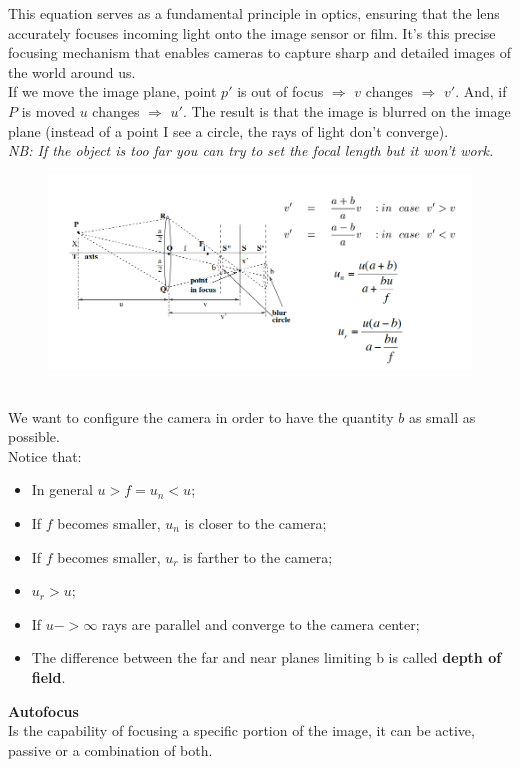 This equation serves as a fundamental principle in optics, ensuring that the lens accurately focuses incoming light onto the image sensor or film. 
It's this precise focusing mechanism that enables cameras to capture sharp and detailed images of the world around us.\\

If we move the image plane, point $p'$ is out of focus $\Rightarrow$ $v$ changes $\Rightarrow$ $v'$. And, if $P$ is moved $u$ changes $\Rightarrow$ $u'$.
The result is that the image is blurred on the image plane (instead of a point I see a circle, the rays of light don't converge).
\\\textit{NB: If the object is too far you can try to set the focal length but it won't work.}
\begin{figure}[h]
    \centering
    \includegraphics[width=1\textwidth]{Figures/Focus.png}
\end{figure}
\\We want to configure the camera in order to have the quantity $b$ as small as possible.
\\Notice that:
\begin{itemize}
    \item In general $u > f = u_n < u$;
    \item If $f$ becomes smaller, $u_n$ is closer to the camera;
    \item If $f$ becomes smaller, $u_r$ is farther to the camera;
    \item $u_r > u$;
    \item If $u -> \infty$ rays are parallel and converge to the camera center;
    \item The difference between the far and near planes limiting b is called \textbf{depth of field}. 
\end{itemize}
\textbf{Autofocus}
\\Is the capability of focusing a specific portion of the image, it can be active, passive or a combination of both.
